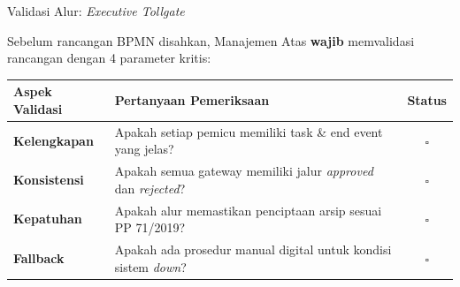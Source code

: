 \documentclass[aspectratio=169,11pt]{beamer}
\begin{document}
\begin{frame}{Validasi Alur: \textit{Executive Tollgate}}
    \vspace{0.2cm}
    \begin{premiumbox}
        \small
        Sebelum rancangan BPMN disahkan, Manajemen Atas \textbf{wajib} memvalidasi rancangan dengan 4 parameter kritis:
    \end{premiumbox}
    \vspace{0.2cm}
    \begin{table}
        \centering
        \scriptsize
        \begin{tabularx}{\textwidth}{@{} >{\raggedright\arraybackslash}X >{\raggedright\arraybackslash}X c @{}}
            \toprule
            \textbf{Aspek Validasi} & \textbf{Pertanyaan Pemeriksaan} & \textbf{Status} \\
            \midrule
            \textbf{Kelengkapan} & Apakah setiap pemicu memiliki task \& end event yang jelas? & $\square$ \\
            \textbf{Konsistensi} & Apakah semua gateway memiliki jalur \textit{approved} dan \textit{rejected}? & $\square$ \\
            \textbf{Kepatuhan} & Apakah alur memastikan penciptaan arsip sesuai PP 71/2019? & $\square$ \\
            \textbf{Fallback} & Apakah ada prosedur manual digital untuk kondisi sistem \textit{down}? & $\square$ \\
            \bottomrule
        \end{tabularx}
    \end{table}
\end{frame}
\end{document}
